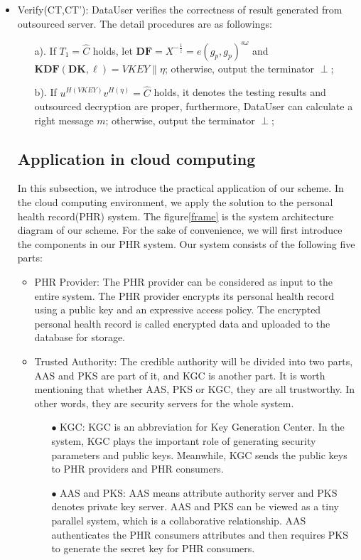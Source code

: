 \documentclass[smallextended]{svjour3}       %
\begin{document}
\begin{itemize}
	\item Verify(CT,CT'): DataUser verifies the correctness of result generated from outsourced server.
		  The detail procedures are as followings: 
		\begin{itemize}
			\item[a).] If $T_1=\widehat{C}$ holds, let $\textbf{DF}=X^{-\frac{1}{z}}=e(g_p,g_p)^{s \omega}$ and $\textbf{KDF}(\textbf{DK},\ell)=VKEY \parallel \eta$; otherwise, output the terminator $\perp$;
			\item[b).] If $u^{H(VKEY)}v^{H(\eta)}=\widehat{C}$ holds, it denotes the testing results and outsourced decryption are proper, furthermore, DataUser can calculate a right message $m$; otherwise, output the terminator $\perp$; 
		\end{itemize}
	
	\subsection{Application in cloud computing}
	In this subsection, we introduce the practical application  of our scheme. 
	In the cloud computing environment, we apply the solution to the personal health record(PHR) system.
	The figure\ref{frame} is the system architecture diagram of our scheme. 
	For the sake of convenience, we will first introduce the components in our PHR system.
	Our system consists of the following five parts:
	\begin{itemize}
		\item PHR Provider: The PHR provider can be considered as input to the entire system. 
							The PHR provider encrypts its personal health record using a public key and an expressive access policy.
							The encrypted personal health record is called encrypted data and uploaded to the database for storage.
		\item Trusted Authority: The credible authority will be divided into two parts, AAS and PKS are part of it, and KGC is another part.
								 It is worth mentioning that whether AAS, PKS or KGC, they are all trustworthy.
								 In other words, they are security servers for the whole system.
							\begin{itemize}
								\item[$\bullet$] KGC: KGC is an abbreviation for Key Generation Center.
													  In the system, KGC plays the important role of generating security parameters and public keys.
													  Meanwhile, KGC sends the public keys to PHR providers and PHR consumers.
								\item[$\bullet$] AAS and PKS: AAS means attribute authority server and PKS denotes private key server. 
												 AAS and PKS can be viewed as a tiny parallel system, which is a  collaborative relationship.
												 AAS authenticates the PHR consumers attributes and then requires PKS to generate the secret key for PHR consumers.


\end{itemize}
\end{itemize}
\end{itemize}
\end{document}
